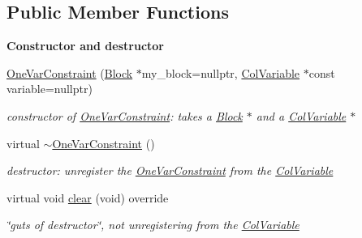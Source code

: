\subsection*{Public Member Functions}
\begin{Indent}\textbf{ Constructor and destructor}\par
\begin{DoxyCompactItemize}
\item 
\mbox{\hyperlink{class_s_m_spp__di__unipi__it_1_1_one_var_constraint_a24c42521f93a4b7b062798ff9248c597}{One\+Var\+Constraint}} (\mbox{\hyperlink{class_s_m_spp__di__unipi__it_1_1_block}{Block}} $\ast$my\+\_\+block=nullptr, \mbox{\hyperlink{class_s_m_spp__di__unipi__it_1_1_col_variable}{Col\+Variable}} $\ast$const variable=nullptr)
\begin{DoxyCompactList}\small\item\em constructor of \mbox{\hyperlink{class_s_m_spp__di__unipi__it_1_1_one_var_constraint}{One\+Var\+Constraint}}\+: takes a \mbox{\hyperlink{class_s_m_spp__di__unipi__it_1_1_block}{Block}} $\ast$ and a \mbox{\hyperlink{class_s_m_spp__di__unipi__it_1_1_col_variable}{Col\+Variable}} $\ast$ \end{DoxyCompactList}\item 
\mbox{\label{class_s_m_spp__di__unipi__it_1_1_one_var_constraint_a2ff0418ca655c37d2ae3ae9c0adb8ef8}} 
virtual \mbox{\hyperlink{class_s_m_spp__di__unipi__it_1_1_one_var_constraint_a2ff0418ca655c37d2ae3ae9c0adb8ef8}{$\sim$\+One\+Var\+Constraint}} ()
\begin{DoxyCompactList}\small\item\em destructor\+: unregister the \mbox{\hyperlink{class_s_m_spp__di__unipi__it_1_1_one_var_constraint}{One\+Var\+Constraint}} from the \mbox{\hyperlink{class_s_m_spp__di__unipi__it_1_1_col_variable}{Col\+Variable}} \end{DoxyCompactList}\item 
\mbox{\label{class_s_m_spp__di__unipi__it_1_1_one_var_constraint_a9862fdd31593937c218bbda548c85fcc}} 
virtual void \mbox{\hyperlink{class_s_m_spp__di__unipi__it_1_1_one_var_constraint_a9862fdd31593937c218bbda548c85fcc}{clear}} (void) override
\begin{DoxyCompactList}\small\item\em \char`\"{}guts of destructor\char`\"{}, not unregistering from the \mbox{\hyperlink{class_s_m_spp__di__unipi__it_1_1_col_variable}{Col\+Variable}} \end{DoxyCompactList}\end{DoxyCompactItemize}
\end{Indent}
